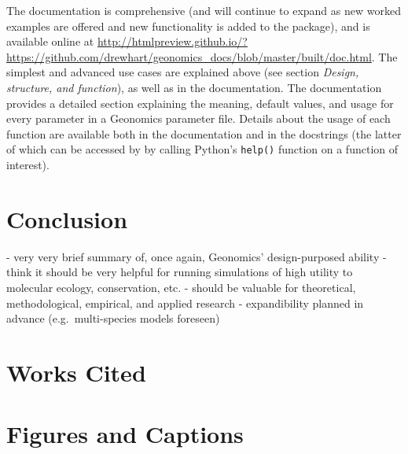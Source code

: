 ﻿\documentclass{article}
\begin{document}
The documentation is comprehensive (and will continue to expand as new worked examples
are offered and new functionality is added to the package), and is available
online at \url{http://htmlpreview.github.io/?https://github.com/drewhart/geonomics\_docs/blob/master/built/doc.html}.  
The simplest and advanced use cases are explained above (see section
\emph{Design, structure, and function}), as well as in the documentation.
The documentation provides a detailed section explaining the meaning,
default values, and usage for every parameter in a Geonomics parameter file.
Details about the usage of each function are available both in the documentation
and in the docstrings (the latter of which can be accessed by by calling Python's
\texttt{help()} function on a function of interest).


\section{Conclusion}
- very very brief summary of, once again, Geonomics' design-purposed ability
- think it should be very helpful for running simulations of high utility to
  molecular ecology, conservation, etc. 
- should be valuable for theoretical, methodological, empirical, and applied research
- expandibility planned in advance (e.g.\ multi-species models foreseen)


\section{Works Cited}



\pagebreak
\section{Figures and Captions}
\end{document}
